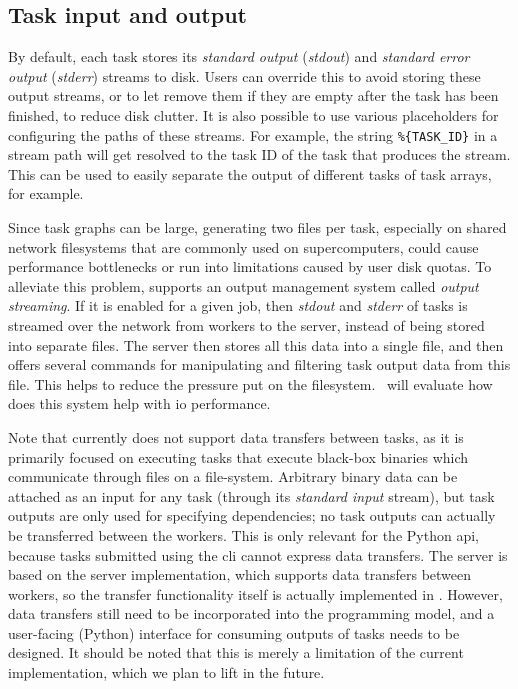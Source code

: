 \subsection{Task input and output}
By default, each \hyperqueue{} task stores its \emph{standard output} (\emph{stdout}) and
\emph{standard error output} (\emph{stderr}) streams to disk. Users can override this to avoid storing these output
streams, or to let \hq{} remove them if they are empty after the task has been
finished, to reduce disk clutter. It is also possible to use various placeholders for configuring
the paths of these streams. For example, the string \texttt{\%\{TASK\_ID\}} in a stream path will
get resolved to the task ID of the task that produces the stream. This can be used to easily
separate the output of different tasks of task arrays, for example.

Since task graphs can be large, generating two files per task, especially on shared network
filesystems that are commonly used on supercomputers, could cause performance bottlenecks or run
into limitations caused by user disk quotas. To alleviate this problem, \hq{}
supports an output management system called \emph{output streaming}. If it is enabled for a given
job, then \emph{stdout} and \emph{stderr} of tasks is streamed over the network
from workers to the server, instead of being stored into separate files. The server then stores all
this data into a single file, and then offers several commands for manipulating and filtering task
output data from this file. This helps to reduce the pressure put on the
filesystem.~ will evaluate how does this system help with
\gls{io} performance.

Note that \hyperqueue{} currently does not support data transfers between tasks, as it is
primarily focused on executing tasks that execute black-box binaries which communicate through
files on a file-system. Arbitrary binary data can be attached as an input for any task (through its
\emph{standard input} stream), but task outputs are only used for specifying dependencies; no
task outputs can actually be transferred between the workers. This is only relevant for the Python
\gls{api}, because tasks submitted using the \gls{cli} cannot express
data transfers. The \hq{} server is based on the \rsds{} server
implementation, which supports data transfers between workers, so the transfer functionality itself
is actually implemented in \hq{}. However, data transfers still need to be
incorporated into the \hyperqueue{} programming model, and a user-facing (Python)
interface for consuming outputs of tasks needs to be designed. It should be noted that this is
merely a limitation of the current implementation, which we plan to lift in the future.

